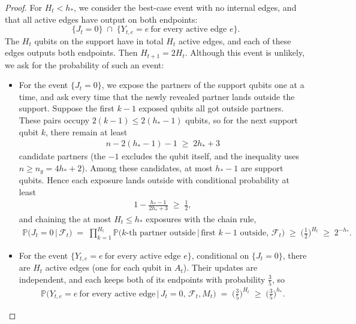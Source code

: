 \documentclass[
    aps,
    superscriptaddress,
    onecolumn,
    10pt,
    prx,
    nofootinbib
]{revtex4-2}
\theoremstyle{namedstatement}
\theoremstyle{plain}
\begin{document}
\begin{proof}
For $H_t<h_\ast$, we consider the best-case event with no internal edges, and that all active edges have output on both endpoints:
\begin{equation}
  \{J_t=0\}\;\cap\;\{Y_{t,e}=e\ \text{for every active edge }e\}.
\end{equation}
The $H_t$ qubits on the support have in total $H_t$ active edges, and each of these edges outputs both endpoints. Then $H_{t+1}=2H_t$. Although this event is unlikely, we ask for the probability of such an event:
\begin{itemize}
  \item For the event $\{J_t=0\}$, we expose the partners of the support qubits one at a time, and ask every time that the newly revealed partner lands outside the support. Suppose the first $k-1$ exposed qubits all got outside partners. These pairs occupy $2(k-1)\le 2(h_\ast-1)$
  qubits, so for the next support qubit $k$, there remain at least
  \begin{align}
      n-2(h_\ast-1)-1 \;\ge\; 2h_\ast+3
  \end{align}
  candidate partners (the $-1$ excludes the qubit itself, and the inequality uses
  $n\ge n_g=4h_\ast+2$). Among these candidates, at most $h_\ast-1$ are support qubits.
  Hence each exposure lands outside with conditional probability at least
  \begin{align}
      1-\frac{h_\ast-1}{2h_\ast+3}\;\ge\;\frac12 ,
  \end{align}
  and chaining the at most $H_t\le h_\ast$ exposures with the chain rule,
  \begin{align}
      \mathbb P\big(J_t=0\,\big|\,\mathcal F_t\big)
      \;=\;\prod_{k=1}^{H_t}
      \mathbb P\big(k\text{-th partner outside}\,\big|\,\text{first }k-1\text{ outside},\,\mathcal F_t\big)
      \;\ge\;\Big(\frac12\Big)^{H_t}
      \;\ge\;2^{-h_\ast}.
  \end{align}
  \item For the event $\{Y_{t,e}=e\ \text{for every active edge }e\}$, conditional on $\{J_t=0\}$, there are $H_t$ active edges (one for each qubit in $A_t$). Their updates are independent, and each keeps both of its endpoints
  with probability $\tfrac35$, so
  \begin{align}
      \mathbb P\big(Y_{t,e}=e\ \text{for every active edge}\,\big|\,J_t=0,\,\mathcal F_t,M_t\big)
      \;=\;\Big(\frac35\Big)^{H_t}
      \;\ge\;\Big(\frac35\Big)^{h_\ast}.
  \end{align}
\end{itemize}

\end{proof}
\end{document}

